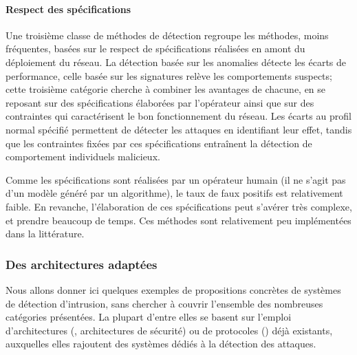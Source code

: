         \paragraph{Respect des spécifications}
Une troisième classe de méthodes de détection regroupe les méthodes, moins fréquentes, basées sur le respect de spécifications réalisées en amont du déploiement du réseau.
La détection basée sur les anomalies détecte les écarts de performance, celle basée sur les signatures relève les comportements suspects; cette troisième catégorie cherche à combiner les avantages de chacune, en se reposant sur des spécifications élaborées par l'opérateur ainsi que sur des contraintes qui caractérisent le bon fonctionnement du réseau.
Les écarts au profil normal spécifié permettent de détecter les attaques en identifiant leur effet, tandis que les contraintes fixées par ces spécifications entraînent la détection de comportement individuels malicieux.

Comme les spécifications sont réalisées par un opérateur humain (il ne s'agit pas d'un modèle généré par un algorithme), le taux de faux positifs est relativement faible.
En revanche, l'élaboration de ces spécifications peut s'avérer très complexe, et prendre beaucoup de temps.
Ces méthodes sont relativement peu implémentées dans la littérature.

    \subsubsection{Des architectures adaptées}
Nous allons donner ici quelques exemples de propositions concrètes de systèmes de détection d'intrusion, sans chercher à couvrir l'ensemble des nombreuses catégories présentées.
La plupart d'entre elles se basent sur l'emploi d'architectures (, architectures de sécurité) ou de protocoles () déjà existants, auxquelles elles rajoutent des systèmes dédiés à la détection des attaques.

